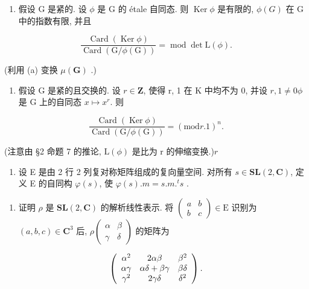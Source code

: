 \begin{enumerate}
\def\labelenumi{(\alph{enumi})}
\setcounter{enumi}{1}
\tightlist
\item
  假设 G 是紧的. 设 \(\phi\) 是 G 的 étale 自同态. 则 \(\operatorname{Ker} \phi\) 是有限的, \(\phi(G)\) 在 G 中的指数有限, 并且
\end{enumerate}

\[
\frac {\operatorname{Card} (\operatorname{Ker} \phi)}{\operatorname{Card} (\mathrm{G} / \phi (\mathrm{G}))} = \operatorname{mod} \det \mathrm{L} (\phi).
\]

(利用 (a) 变换 \(\mu (\mathbf{G})\) .)

\begin{enumerate}
\def\labelenumi{(\alph{enumi})}
\setcounter{enumi}{2}
\tightlist
\item
  假设 G 是紧的且交换的. 设 \(r \in \mathbf{Z}\), 使得 r, 1 在 K 中均不为 0, 并设 \(r, 1 \neq 0\)\(\phi\) 是 G 上的自同态 \(x \mapsto x^r\). 则
\end{enumerate}

\[
\frac {\operatorname{Card} (\operatorname{Ker} \phi)}{\operatorname{Card} (\mathrm{G} / \phi (\mathrm{G}))} = (\mathrm{mod} r. 1) ^ {n}.
\]

(注意由 §2 命题 7 的推论, \(\mathrm{L}(\phi)\) 是比为 r 的伸缩变换.)\(r\)

\begin{enumerate}
\def\labelenumi{\arabic{enumi}.}
\setcounter{enumi}{2}
\tightlist
\item
  设 E 是由 2 行 2 列复对称矩阵组成的复向量空间. 对所有 \(s \in \mathbf{SL}(2, \mathbf{C})\), 定义 E 的自同构 \(\varphi(s)\), 使 \(\varphi(s).m = s.m.^t s\) .
\end{enumerate}

\begin{enumerate}
\def\labelenumi{(\alph{enumi})}
\tightlist
\item
  证明 \(\rho\) 是 \(\mathbf{SL}(2, \mathbf{C})\) 的解析线性表示. 将 \(\begin{pmatrix} a & b \\ b & c \end{pmatrix} \in \mathrm{E}\) 识别为 \((a, b, c) \in \mathbf{C}^3\) 后, \(\rho\begin{pmatrix} \alpha & \beta \\ \gamma & \delta \end{pmatrix}\) 的矩阵为
\end{enumerate}

\[
\left( \begin{array}{c c c} \alpha^ {2} & 2 \alpha \beta & \beta^ {2} \\ \alpha \gamma & \alpha \delta + \beta \gamma & \beta \delta \\ \gamma^ {2} & 2 \gamma \delta & \delta^ {2} \end{array} \right).
\]

